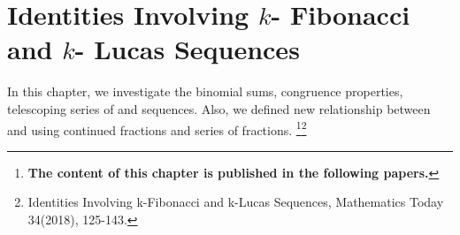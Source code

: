 %
%
\let\textcircled=\pgftextcircled
\chapter{Identities Involving $k$- Fibonacci and $k$- Lucas Sequences}
\label{chap:Identities Involving }
In this chapter, we investigate the binomial sums, congruence properties, telescoping series of \kF\vspace{1mm} and \kL\vspace{.5mm} sequences. Also, we defined new relationship between \kF\vspace{1mm} and \kL\vspace{.5mm} using continued fractions and series of fractions.
\vspace{2mm}
\let\thefootnote\relax\footnote{\textbf{\hspace{-0.78cm}The content of this chapter is published in the following papers.}}\footnote{\hspace{-0.78cm}Identities Involving k-Fibonacci and k-Lucas Sequences, Mathematics Today 34(2018), 125-143.}
